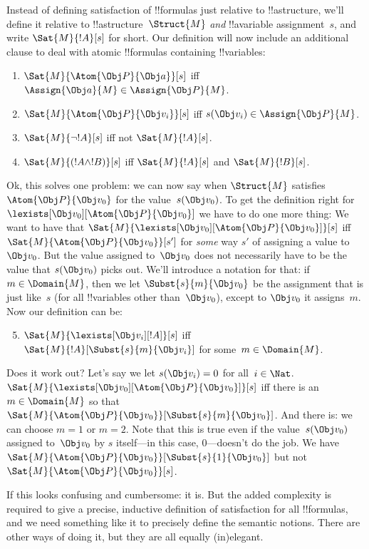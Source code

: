 \documentclass[../../../include/open-logic-section]{subfiles}
\begin{document}
Instead of defining satisfaction of !!{formula}s just relative to
!!a{structure}, we'll define it relative to
!!a{structure}~$\Struct{M}$ \emph{and} !!a{variable} assignment~$s$,
and write $\Sat{M}{!A}[s]$ for short. Our definition will now include
an additional clause to deal with atomic !!{formula}s containing
!!{variable}s:
\begin{enumerate}
  \item $\Sat{M}{\Atom{\Obj P}{\Obj a}}[s]$ iff
  $\Assign{\Obj a}{M} \in \Assign{\Obj P}{M}$.
  \item $\Sat{M}{\Atom{\Obj P}{\Obj v_i}}[s]$ iff
  $s(\Obj v_i) \in \Assign{\Obj P}{M}$.
  \item $\Sat{M}{\lnot !A}[s]$ iff not $\Sat{M}{!A}[s]$.
  \item $\Sat{M}{(!A \land !B)}[s]$ iff $\Sat{M}{!A}[s]$ and $\Sat{M}{!B}[s]$.
\end{enumerate}
Ok, this solves one problem: we can now say when $\Struct{M}$
satisfies $\Atom{\Obj P}{\Obj v_0}$ for the value~$s(\Obj v_0)$. To
get the definition right for $\lexists[\Obj v_0][\Atom{\Obj P}{\Obj
v_0}]$ we have to do one more thing:  We want to have that
$\Sat{M}{\lexists[\Obj v_0][\Atom{\Obj P}{\Obj v_0}]}[s]$ iff
$\Sat{M}{\Atom{\Obj P}{\Obj v_0}}[s']$ for \emph{some} way $s'$ of
assigning a value to~$\Obj v_0$. But the value assigned to~$\Obj v_0$
does not necessarily have to be the value that $s(\Obj v_0)$ picks
out.  We'll introduce a notation for that: if $m \in \Domain{M}$, then
we let $\Subst{s}{m}{\Obj v_0}$ be the assignment that is just
like~$s$ (for all !!{variable}s other than~$\Obj v_0$), except to
$\Obj v_0$ it assigns~$m$. Now our definition can be:
\begin{enumerate}\setcounter{enumi}{4}
  \item $\Sat{M}{\lexists[\Obj v_i][!A]}[s]$ iff
  $\Sat{M}{!A}[\Subst{s}{m}{\Obj v_i}]$ for some~$m \in \Domain{M}$.
\end{enumerate}
Does it work out? Let's say we let $s(\Obj v_i) = 0$ for all~$i \in
\Nat$. $\Sat{M}{\lexists[\Obj v_0][\Atom{\Obj P}{\Obj v_0}]}[s]$ iff
there is an $m \in \Domain{M}$ so that $\Sat{M}{\Atom{\Obj P}{\Obj
v_0}}[\Subst{s}{m}{\Obj v_0}]$. And there is: we can choose $m = 1$ or
$m = 2$. Note that this is true even if the value~$s(\Obj v_0)$
assigned to~$\Obj v_0$ by $s$ itself---in this case, $0$---doesn't do
the job. We have $\Sat{M}{\Atom{\Obj P}{\Obj v_0}}[\Subst{s}{1}{\Obj
v_0}]$ but not $\Sat{M}{\Atom{\Obj P}{\Obj v_0}}[s]$.

If this looks confusing and cumbersome: it is. But the added
complexity is required to give a precise, inductive definition of
satisfaction for all !!{formula}s, and we need something like it to
precisely define the semantic notions.  There are other ways of doing
it, but they are all equally (in)elegant.
\end{document}
